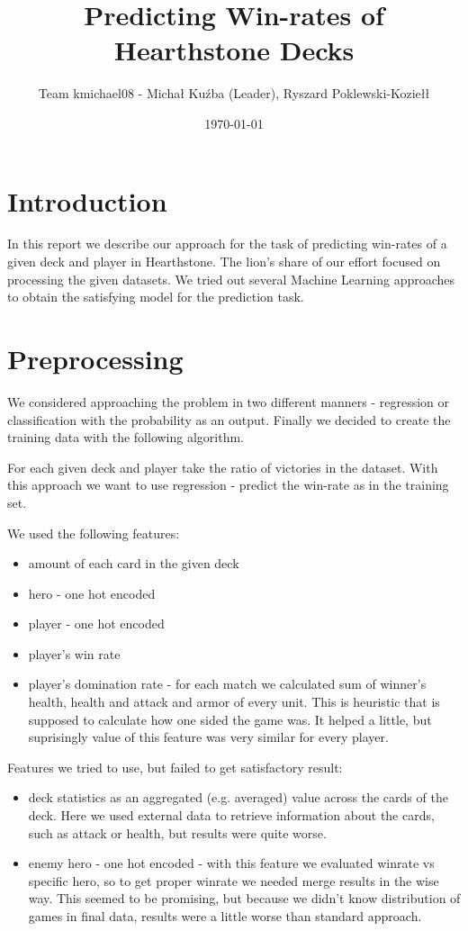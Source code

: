 \documentclass[a4paper]{article}
\title{Predicting Win-rates of Hearthstone Decks}
\author{Team kmichael08 - Michał Kuźba (Leader), Ryszard Poklewski-Koziełł}
\date{\today}
\begin{document}
\maketitle

\section{Introduction}
\label{sec:introduction}
In this report we describe our approach for the task of predicting win-rates of a given deck and player in Hearthstone. 
The lion's share of our effort focused on processing the given datasets.
We tried out several Machine Learning approaches to obtain the satisfying model for the prediction task.

\section{Preprocessing}
We considered approaching the problem in two different manners - regression or classification with the probability as an output. 
Finally we decided to create the training data with the following algorithm.

For each given deck and player take the ratio of victories in the dataset.
With this approach we want to use regression - predict the win-rate as in the training set.

We used the following features:
\begin{itemize}
\item amount of each card in the given deck
\item hero - one hot encoded
\item player - one hot encoded
\item player's win rate
\item player's domination rate - for each match we calculated sum of winner's health, health and attack and armor of every unit. This is heuristic that is supposed to calculate how one sided the game was. It helped a little, but suprisingly value of this feature was very similar for every player.
\end{itemize}

Features we tried to use, but failed to get satisfactory result:
\begin{itemize}
\item deck statistics as an aggregated (e.g. averaged) value across the cards of the deck. Here we used external data to retrieve information about the cards, such as attack or health, but results were quite worse.
\item enemy hero - one hot encoded - with this feature we evaluated winrate vs specific hero, so to get proper winrate we needed merge results in the wise way. This seemed to be promising, but because we didn't know distribution of games in final data, results were a little worse than standard approach.

\end{itemize}
\end{document}
